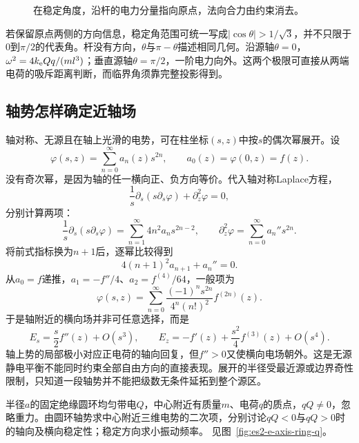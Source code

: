 \begin{solution}
\begin{figure}[H]
\begin{tikzpicture}[>=Stealth,line cap=round,line join=round]
\end{tikzpicture}
\caption{在稳定角度，沿杆的电力分量指向原点，法向合力由约束消去。}\label{fig:es2-e2-s}
\end{figure}


若保留原点两侧的方向信息，稳定角范围可统一写成$|\cos\theta|>1/\sqrt3$，并不只限于$0$到$\pi/2$的代表角。杆没有方向，$\theta$与$\pi-\theta$描述相同几何。沿源轴$\theta=0$，$\omega^2=4k_{\rm e} Qq/(ml^3)$；垂直源轴$\theta=\pi/2$，一阶电力向外。这两个极限可直接从两端电荷的吸斥距离判断，而临界角须靠完整投影得到。
\end{solution}

\subsection{轴势怎样确定近轴场}\label{sec:es-axis-series}
轴对称、无源且在轴上光滑的电势，可在柱坐标$(s,z)$中按$s$的偶次幂展开。设
\[\varphi(s,z)=\sum_{n=0}^{\infty}a_n(z)s^{2n},\qquad
a_0(z)=\varphi(0,z)=f(z).
\]
没有奇次幂，是因为轴的任一横向正、负方向等价。代入轴对称Laplace方程，
\[\frac1s\partial_s(s\partial_s\varphi)+\partial_z^2\varphi=0,
\]
分别计算两项：
\[\frac1s\partial_s(s\partial_s\varphi)
=\sum_{n=1}^{\infty}4n^2a_n s^{2n-2},\qquad
\partial_z^2\varphi=\sum_{n=0}^{\infty}a_n''s^{2n}.
\]
将前式指标换为$n+1$后，逐幂比较得到
\[4(n+1)^2a_{n+1}+a_n''=0.
\]
从$a_0=f$递推，$a_1=-f''/4$、$a_2=f^{(4)}/64$，一般项为
\[\boxed{\varphi(s,z)=\sum_{n=0}^{\infty}
\frac{(-1)^n s^{2n}}{4^n(n!)^2}f^{(2n)}(z)}.
\]
于是轴附近的横向场并非可任意选择，而是
\[E_s=\frac s2f''(z)+O(s^3),\qquad
E_z=-f'(z)+\frac{s^2}{4}f^{(3)}(z)+O(s^4).
\]
轴上势的局部极小对应正电荷的轴向回复，但$f''>0$又使横向电场朝外。这是无源静电平衡不能同时约束全部自由方向的直接表现。展开的半径受最近源或边界奇性限制，只知道一段轴势并不能把级数无条件延拓到整个源区。



\begin{example}[带电圆环的轴向振动与横向失稳]\label{ex:es2-e-axis-ring}
半径$a$的固定绝缘圆环均匀带电$Q$，中心附近有质量$m$、电荷$q$的质点，$qQ\ne0$，忽略重力。由圆环轴势求中心附近三维电势的二次项，分别讨论$qQ<0$与$qQ>0$时的轴向及横向稳定性；稳定方向求小振动频率。 见图~\ref{fig:es2-e-axis-ring-q}。
\end{example}

